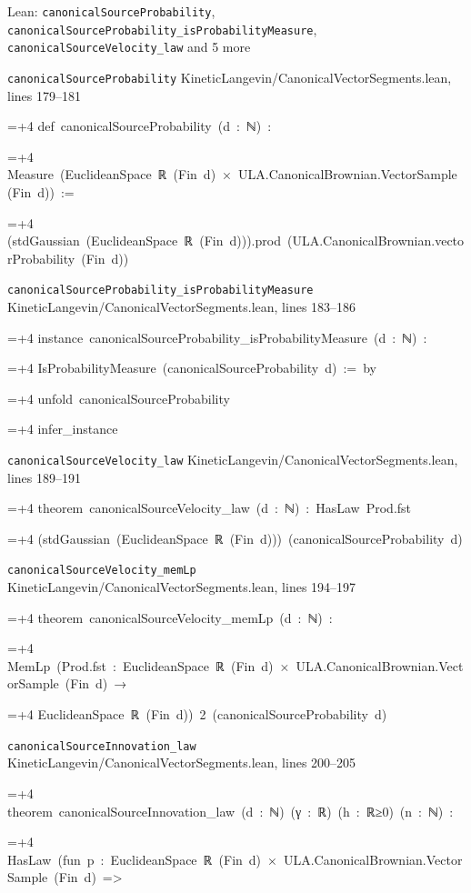 \documentclass[11pt,a4paper]{article}
\newlength{\leancharwidth}
\newenvironment{leancode}{\par\smallskip\begingroup\ttfamily\footnotesize\raggedright
  \settowidth{\leancharwidth}{M}\setlength{\parskip}{0pt}\setlength{\parindent}{0pt}
  \frenchspacing}{\par\endgroup\smallskip}
\newcommand{\leanline}[2]{\hangindent=\dimexpr#1\leancharwidth+4\leancharwidth\relax
  \hangafter=1\noindent\hspace*{#1\leancharwidth}#2\par}
\newcommand{\leansource}[1]{\par{\footnotesize\color{leanmuted}#1}\par}
\begin{document}
\begin{leanbox}{Lean: \texttt{canonicalSourceProbability}, \texttt{canonicalSourceProbability\_\allowbreak{}isProbabilityMeasure}, \texttt{canonicalSourceVelocity\_\allowbreak{}law} and 5 more}
\leansource{\texttt{canonicalSourceProbability} \quad KineticLangevin/\allowbreak{}CanonicalVectorSegments.lean, lines 179–181}
\begin{leancode}
\leanline{0}{def\ canonicalSourceProbability\ (d\ :\ ℕ)\ :}
\leanline{4}{Measure\ (EuclideanSpace\ ℝ\ (Fin\ d)\ ×\ ULA.CanonicalBrownian.VectorSample\ (Fin\ d))\ :=}
\leanline{2}{(stdGaussian\ (EuclideanSpace\ ℝ\ (Fin\ d))).prod\ (ULA.CanonicalBrownian.vectorProbability\ (Fin\ d))}
\end{leancode}
\leansource{\texttt{canonicalSourceProbability\_\allowbreak{}isProbabilityMeasure} \quad KineticLangevin/\allowbreak{}CanonicalVectorSegments.lean, lines 183–186}
\begin{leancode}
\leanline{0}{instance\ canonicalSourceProbability\_isProbabilityMeasure\ (d\ :\ ℕ)\ :}
\leanline{4}{IsProbabilityMeasure\ (canonicalSourceProbability\ d)\ :=\ by}
\leanline{2}{unfold\ canonicalSourceProbability}
\leanline{2}{infer\_instance}
\end{leancode}
\leansource{\texttt{canonicalSourceVelocity\_\allowbreak{}law} \quad KineticLangevin/\allowbreak{}CanonicalVectorSegments.lean, lines 189–191}
\begin{leancode}
\leanline{0}{theorem\ canonicalSourceVelocity\_law\ (d\ :\ ℕ)\ :\ HasLaw\ Prod.fst}
\leanline{4}{(stdGaussian\ (EuclideanSpace\ ℝ\ (Fin\ d)))\ (canonicalSourceProbability\ d)}
\end{leancode}
\leansource{\texttt{canonicalSourceVelocity\_\allowbreak{}memLp} \quad KineticLangevin/\allowbreak{}CanonicalVectorSegments.lean, lines 194–197}
\begin{leancode}
\leanline{0}{theorem\ canonicalSourceVelocity\_memLp\ (d\ :\ ℕ)\ :}
\leanline{4}{MemLp\ (Prod.fst\ :\ EuclideanSpace\ ℝ\ (Fin\ d)\ ×\ ULA.CanonicalBrownian.VectorSample\ (Fin\ d)\ →}
\leanline{6}{EuclideanSpace\ ℝ\ (Fin\ d))\ 2\ (canonicalSourceProbability\ d)}
\end{leancode}
\leansource{\texttt{canonicalSourceInnovation\_\allowbreak{}law} \quad KineticLangevin/\allowbreak{}CanonicalVectorSegments.lean, lines 200–205}
\begin{leancode}
\leanline{0}{theorem\ canonicalSourceInnovation\_law\ (d\ :\ ℕ)\ (γ\ :\ ℝ)\ (h\ :\ ℝ≥0)\ (n\ :\ ℕ)\ :}
\leanline{4}{HasLaw\ (fun\ p\ :\ EuclideanSpace\ ℝ\ (Fin\ d)\ ×\ ULA.CanonicalBrownian.VectorSample\ (Fin\ d)\ =>}

\end{leancode}
\end{leanbox}
\end{document}
